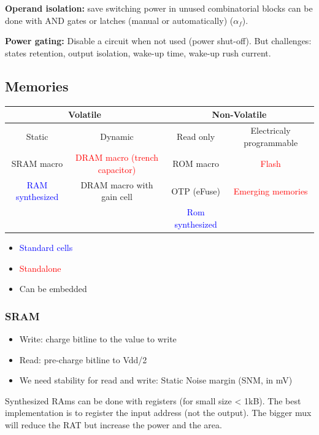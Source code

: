 \textbf{Operand isolation:} save switching power in unused combinatorial blocks can be done with AND gates or latches (manual or automatically) (\(\alpha_f\)).

\textbf{Power gating:} Disable a circuit when not used (power shut-off). But challenges: states retention, output isolation, wake-up time, wake-up rush current.


\subsection{Memories}

\begin{center}
  \begin{tabular}{|c|c|c|c|}
    \hline
    \multicolumn{2}{|c|}{Volatile}&\multicolumn{2}{c|}{Non-Volatile}\\
    \hline
    Static&Dynamic&Read only&Electricaly programmable\\
    \hline
    \hline
    SRAM macro& \textcolor{red}{DRAM macro (trench capacitor)}&ROM macro& \textcolor{red}{Flash}\\
    \hline
  \textcolor{blue}{RAM synthesized}&DRAM macro with gain cell&OTP (eFuse)&\textcolor{red}{Emerging memories}\\
    \hline
&&\textcolor{blue}{Rom synthesized}&\\
    \hline
  \end{tabular}
\end{center}
\begin{itemize}
  \item \textcolor{blue}{Standard cells}
  \item \textcolor{red}{Standalone}
  \item Can be embedded
\end{itemize}

\subsubsection{SRAM}
\begin{itemize}
  \item Write: charge bitline to the value to write
  \item Read: pre-charge bitline to Vdd/2
  \item We need stability for read and write: Static Noise margin (SNM, in mV)
\end{itemize}


Synthesized RAms can be done with registers (for small size < 1kB). The best implementation is to register the input address (not the output). 
\bigbreak
The bigger mux will reduce the RAT but increase the power and the area.



